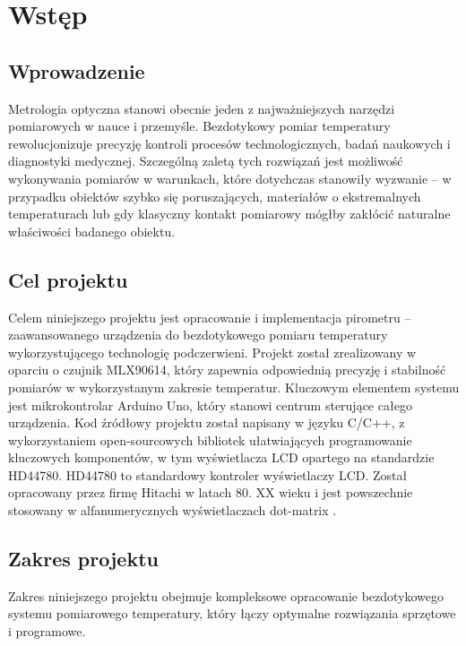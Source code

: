 \chapter{Wstęp}
    \section{Wprowadzenie}
    Metrologia optyczna stanowi obecnie jeden z najważniejszych narzędzi pomiarowych w nauce i przemyśle. Bezdotykowy pomiar temperatury rewolucjonizuje precyzję kontroli procesów technologicznych, badań naukowych i diagnostyki medycznej. Szczególną zaletą tych rozwiązań jest możliwość wykonywania pomiarów w warunkach, które dotychczas stanowiły wyzwanie – w przypadku obiektów szybko się poruszających, materiałów o ekstremalnych temperaturach lub gdy klasyczny kontakt pomiarowy mógłby zakłócić naturalne właściwości badanego obiektu.
    \section{Cel projektu}
    Celem niniejszego projektu jest opracowanie i implementacja pirometru – zaawansowanego urządzenia do bezdotykowego pomiaru temperatury wykorzystującego technologię podczerwieni. Projekt został zrealizowany w oparciu o czujnik MLX90614, który zapewnia odpowiednią precyzję i stabilność pomiarów w wykorzystanym zakresie temperatur. Kluczowym elementem systemu jest mikrokontrolar Arduino Uno, który stanowi centrum sterujące całego urządzenia. Kod źródłowy projektu został napisany w języku C/C++, z wykorzystaniem open-sourcowych bibliotek ułatwiających programowanie kluczowych komponentów, w tym wyświetlacza LCD opartego na standardzie HD44780. HD44780 to standardowy kontroler wyświetlaczy LCD. Został opracowany przez firmę Hitachi w latach 80. XX wieku i jest powszechnie stosowany w alfanumerycznych wyświetlaczach dot-matrix \cite{1}.
    \section{Zakres projektu}
    Zakres niniejszego projektu obejmuje kompleksowe opracowanie bezdotykowego systemu pomiarowego temperatury, który łączy optymalne rozwiązania sprzętowe i programowe.